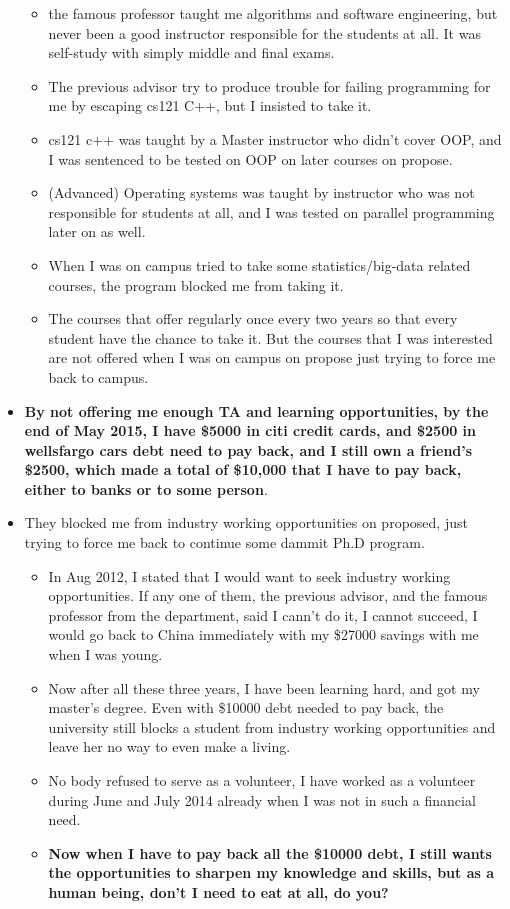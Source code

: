 \documentclass[9pt,b5paper]{article}
\begin{document}
\begin{itemize}
\begin{itemize}
\item the famous professor taught me algorithms and software engineering, but never been a good instructor responsible for the students at all. It was self-study with simply middle and final exams.
\item The previous advisor try to produce trouble for failing programming for me by escaping cs121 C++, but I insisted to take it.
\item cs121 c++ was taught by a Master instructor who didn't cover OOP, and I was sentenced to be tested on OOP on later courses on propose.
\item (Advanced) Operating systems was taught by instructor who was not responsible for students at all, and I was tested on parallel programming later on as well.
\item When I was on campus tried to take some statistics/big-data related courses, the program blocked me from taking it.
\item The courses that offer regularly once every two years so that every student have the chance to take it. But the courses that I was interested are not offered when I was on campus on propose just trying to force me back to campus.
\end{itemize}
\item \textbf{By not offering me enough TA and learning opportunities, by the end of May 2015, I have \$5000 in citi credit cards, and \$2500 in wellsfargo cars debt need to pay back, and I still own a friend's \$2500, which made a total of \$10,000 that I have to pay back, either to banks or to some person}.
\item They blocked me from industry working opportunities on proposed, just trying to force me back to continue some dammit Ph.D program. 
\begin{itemize}
\item In Aug 2012, I stated that I would want to seek industry working opportunities. If any one of them, the previous advisor, and the famous professor from the department, said I cann't do it, I cannot succeed, I would go back to China immediately with my \$27000 savings with me when I was young.
\item Now after all these three years, I have been learning hard, and got my master's degree. Even with \$10000 debt needed to pay back, the university still blocks a student from industry working opportunities and leave her no way to even make a living.
\item No body refused to serve as a volunteer, I have worked as a volunteer during June and July 2014 already when I was not in such a financial need.
\item \textbf{Now when I have to pay back all the \$10000 debt, I still wants the opportunities to sharpen my knowledge and skills, but as a human being, don't I need to eat at all, do you?}
\end{itemize}
\end{itemize}
\end{document}
